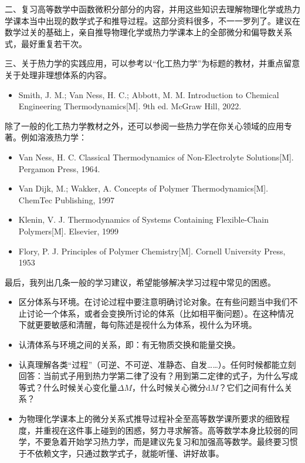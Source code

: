 \documentclass[main.tex]{subfiles}
\begin{document}
二、复习高等数学中函数微积分部分的内容，并用这些知识去理解物理化学或热力学课本当中出现的数学式子和推导过程。这部分资料很多，不一一罗列了。建议在数学过关的基础上，亲自推导物理化学或热力学课本上的全部微分和偏导数关系式，最好重复若干次。

三、关于热力学的实践应用，可以参考以“化工热力学”为标题的教材，并重点留意关于处理非理想体系的内容。
\begin{itemize}
    \item Smith, J. M.; Van Ness, H. C.; Abbott, M. M. Introduction to Chemical Engineering Thermodynamics[M]. 9th ed. McGraw Hill, 2022.
\end{itemize}
除了一般的化工热力学教材之外，还可以参阅一些热力学在你关心领域的应用专著。例如溶液热力学：
\begin{itemize}
    \item Van Ness, H. C. Classical Thermodynamics of Non-Electrolyte Solutions[M]. Pergamon Press, 1964.
    \item Van Dijk, M.; Wakker, A. Concepts of Polymer Thermodynamics[M]. ChemTec Publishing, 1997
    \item Klenin, V. J. Thermodynamics of Systems Containing Flexible-Chain Polymers[M]. Elsevier, 1999
    \item Flory, P. J. Principles of Polymer Chemistry[M]. Cornell University Press, 1953
\end{itemize}

最后，我列出几条一般的学习建议，希望能够解决学习过程中常见的困惑。
\begin{itemize}
    \item 区分体系与环境。在讨论过程中要注意明确讨论对象。在有些问题当中我们不止讨论一个体系，或者会变换所讨论的体系（比如相平衡问题）。在这种情况下就更要敏感和清醒，每句陈述是视什么为体系，视什么为环境。
    \item 认清体系与环境之间的关系，即：有无物质交换和能量交换。
    \item 认真理解各类“过程”（可逆、不可逆、准静态、自发……）。任何时候都能立刻回答：当前式子用到热力学第二律了没有？用到第二定律的式子，为什么写成等式？什么时候关心变化量$\Delta M$，什么时候关心微分$\mathrm{d}M$？它们之间有什么关系？
    \item 为物理化学课本上的微分关系式推导过程补全至高等数学课所要求的细致程度，并重视在这件事上碰到的困惑，努力寻求解答。高等数学本身比较弱的同学，不要急着开始学习热力学，而是建议先复习和加强高等数学。最终要习惯于不依赖文字，只通过数学式子，就能听懂、讲好故事。
\end{itemize}
\end{document}
